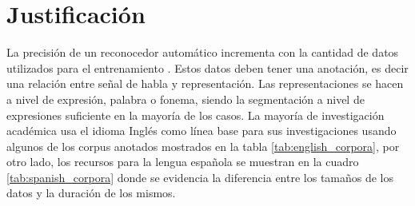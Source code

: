 \section{Justificación}

La precisión de un reconocedor automático incrementa con la cantidad de datos utilizados para el entrenamiento \cite{MooreAListeners}. Estos datos deben tener una anotación, es decir una relación entre señal de habla y representación. Las representaciones se hacen a nivel de expresión, palabra o fonema, siendo la segmentación a nivel de expresiones suficiente en la mayoría de los casos. La mayoría de investigación académica usa el idioma Inglés como línea base para sus investigaciones usando algunos de los corpus anotados mostrados en la tabla \ref{tab:english_corpora}, por otro lado, los recursos para la lengua española se muestran en la cuadro \ref{tab:spanish_corpora} donde se evidencia la diferencia entre los tamaños de los datos y la duración de los mismos.





